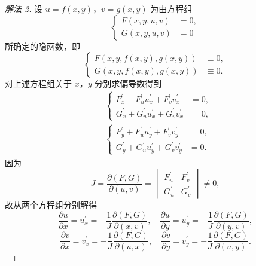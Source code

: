 \begin{proof}[解法 2]
设 $u = f(x,y)$，$v = g(x,y)$ 为由方程组
\[
  \left\{\begin{aligned}
    F(x,y,u,v) &= 0, \\
    G(x,y,u,v) &= 0
  \end{aligned}\right.
\]
所确定的隐函数，即
\[
  \left\{\begin{aligned}
    F(x,y,f(x,y),g(x,y)) &\equiv 0, \\
    G(x,y,f(x,y),g(x,y)) &\equiv 0.
  \end{aligned}\right.
\]
对上述方程组关于 $x$，$y$ 分别求偏导数得到
\begin{align*}
  &\left\{\begin{aligned}
    F_{x}^{\prime} + F_{u}^{\prime}u_{x}^{\prime} + F_{v}^{\prime}v_{x}^{\prime} &= 0, \\
    G_{x}^{\prime} + G_{u}^{\prime}u_{x}^{\prime} + G_{v}^{\prime}v_{x}^{\prime} &= 0,
  \end{aligned}\right. \\
  &\left\{\begin{aligned}
    F_{y}^{\prime} + F_{u}^{\prime}u_{y}^{\prime} + F_{v}^{\prime}v_{y}^{\prime} &= 0, \\
    G_{y}^{\prime} + G_{u}^{\prime}u_{y}^{\prime} + G_{v}^{\prime}v_{y}^{\prime} &= 0.
  \end{aligned}\right.
\end{align*}
因为
\[
  J = \frac{\partial(F,G)}{\partial(u,v)} = \begin{vmatrix} F_{u}^{\prime} & F_{v}^{\prime} \\ G_{u}^{\prime} & G_{v}^{\prime} \end{vmatrix} \neq 0,
\]
故从两个方程组分别解得
\[
  \frac{\partial u}{\partial x} = u_{x}^{\prime} = -\frac{1}{J}\frac{\partial(F,G)}{\partial(x,v)},\quad \frac{\partial u}{\partial y} = u_{y}^{\prime} = -\frac{1}{J}\frac{\partial(F,G)}{\partial(y,v)},
\]
\[
  \frac{\partial v}{\partial x} = v_{x}^{\prime} = -\frac{1}{J}\frac{\partial(F,G)}{\partial(u,x)},\quad \frac{\partial v}{\partial y} = v_{y}^{\prime} = -\frac{1}{J}\frac{\partial(F,G)}{\partial(u,y)}.
\]
\end{proof}


